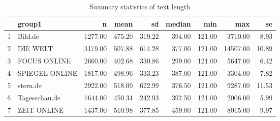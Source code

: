 \begin{table}[ht]
\centering
\caption{Summary statistics of text length} 
\begin{tabular}{rlrrrrrrr}
  \hline
 & group1 & n & mean & sd & median & min & max & se \\ 
  \hline
1 & Bild.de & 1277.00 & 475.20 & 319.22 & 394.00 & 121.00 & 3710.00 & 8.93 \\ 
  2 & DIE WELT & 3179.00 & 507.88 & 614.28 & 377.00 & 121.00 & 14507.00 & 10.89 \\ 
  3 & FOCUS ONLINE & 2660.00 & 402.68 & 330.86 & 299.00 & 121.00 & 5647.00 & 6.42 \\ 
  4 & SPIEGEL ONLINE & 1817.00 & 498.96 & 333.23 & 387.00 & 121.00 & 3304.00 & 7.82 \\ 
  5 & stern.de & 2922.00 & 518.09 & 622.99 & 376.50 & 121.00 & 9287.00 & 11.53 \\ 
  6 & Tagesschau.de & 1644.00 & 450.34 & 242.93 & 397.50 & 121.00 & 2006.00 & 5.99 \\ 
  7 & ZEIT ONLINE & 1437.00 & 510.98 & 377.85 & 459.00 & 121.00 & 8015.00 & 9.97 \\ 
   \hline
\end{tabular}
\label{t_wordcount}
\end{table}
